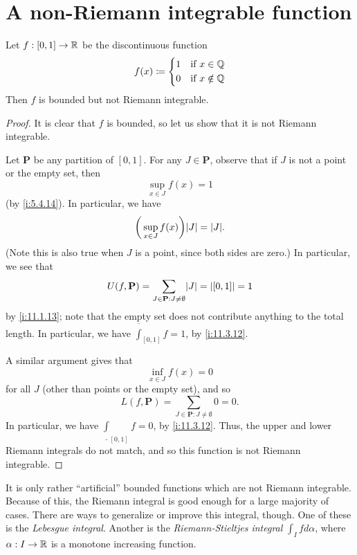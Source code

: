 \section{A non-Riemann integrable function}\label{i:sec:11.7}

\begin{prop}\label{i:11.7.1}
  Let \(f : [0, 1] \to \mathbb{R}\) be the discontinuous function
  \[
    f(x) \coloneqq \begin{dcases}
      1 & \text{if } x \in \mathbb{Q}    \\
      0 & \text{if } x \notin \mathbb{Q}
    \end{dcases}
  \]
  Then \(f\) is bounded but not Riemann integrable.
\end{prop}

\begin{proof}
  It is clear that \(f\) is bounded, so let us show that it is not Riemann integrable.

  Let \(\mathbf{P}\) be any partition of \([0, 1]\).
  For any \(J \in \mathbf{P}\), observe that if \(J\) is not a point or the empty set, then
  \[
    \sup_{x \in J} f(x) = 1
  \]
  (by \cref{i:5.4.14}).
  In particular, we have
  \[
    \bigg(\sup_{x \in J} f(x)\bigg) \abs{J} = \abs{J}.
  \]
  (Note this is also true when \(J\) is a point, since both sides are zero.)
  In particular, we see that
  \[
    U(f, \mathbf{P}) = \sum_{J \in \mathbf{P} : J \neq \emptyset} \abs{J} = \abs{[0, 1]} = 1
  \]
  by \cref{i:11.1.13};
  note that the empty set does not contribute anything to the total length.
  In particular, we have \(\overline{\int}_{[0, 1]} f = 1\), by \cref{i:11.3.12}.

  A similar argument gives that
  \[
    \inf_{x \in J} f(x) = 0
  \]
  for all \(J\) (other than points or the empty set), and so
  \[
    L(f, \mathbf{P}) = \sum_{J \in \mathbf{P} : J \neq \emptyset} 0 = 0.
  \]
  In particular, we have \(\underline{\int}_{[0, 1]} f = 0\), by \cref{i:11.3.12}.
  Thus, the upper and lower Riemann integrals do not match, and so this function is not Riemann integrable.
\end{proof}

\begin{rmk}\label{i:11.7.2}
  It is only rather ``artificial'' bounded functions which are not Riemann integrable.
  Because of this, the Riemann integral is good enough for a large majority of cases.
  There are ways to generalize or improve this integral, though.
  One of these is the \emph{Lebesgue integral}.
  Another is the \emph{Riemann-Stieltjes integral} \(\int_I f d\alpha\), where \(\alpha : I \to \mathbb{R}\) is a monotone increasing function.
\end{rmk}

